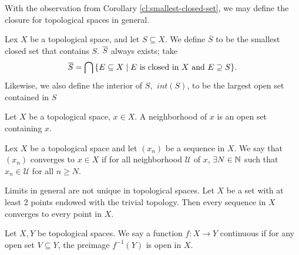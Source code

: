 With the observation from Corollary \ref{cl:smallest-closed-set}, we may define the closure for topological spaces in general.

\begin{df}
    Lex $X$ be a topological space, and let $S\subseteq X$. We define $\overline S$ to be the smallest closed set that contains $S$. $\Bar S$ always exists; take
    \[
    \Bar S = \bigcap\set{E\subseteq X \mid E \text{ is closed in }X\text{ and }E\supseteq S}.
    \]
    Likewise, we also define the interior of $S$, $~int (S)$, to be the largest open set contained in $S$
\end{df}

\begin{df}
    Let $X$ be a topological space, $x\in X$. A neighborhood of $x$ is an open set containing $x$.
\end{df}

\begin{df}
    Lex $X$ be a topological space and let $(x_n)$ be a sequence in $X$. We say that $(x_n)$ converges to $x\in X$ if for all neighborhood $\mathcal U$ of $x$, $\exists N\in \N$ such that $x_n \in \mathcal U$ for all $n\geq N$.
\end{df}

\begin{ex}
    Limits in general are not unique in topological spaces. Let $X$ be a set with at least $2$ points endowed with the trivial topology. Then every sequence in $X$ converges to every point in $X$.
\end{ex}

\begin{df}
    Let $X, Y$ be topological spaces. We say a function $f: X\to Y$ continuous if for any open set $V\subseteq Y$, the preimage $f^{-1}(Y)$ is open in $X$.
\end{df}

